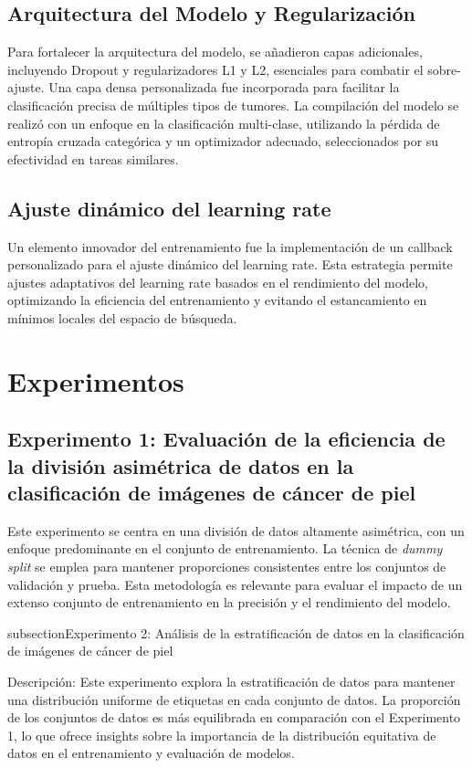 \subsection{Arquitectura del Modelo y Regularización}

Para fortalecer la arquitectura del modelo, se añadieron capas adicionales, incluyendo Dropout y regularizadores L1 y L2, esenciales para combatir el sobre-ajuste. Una capa densa personalizada fue incorporada para facilitar la clasificación precisa de múltiples tipos de tumores. La compilación del modelo se realizó con un enfoque en la clasificación multi-clase, utilizando la pérdida de entropía cruzada categórica y un optimizador adecuado, seleccionados por su efectividad en tareas similares.

\subsection{Ajuste dinámico del learning rate}

Un elemento innovador del entrenamiento fue la implementación de un callback personalizado para el ajuste dinámico del learning rate. Esta estrategia permite ajustes adaptativos del learning rate basados en el rendimiento del modelo, optimizando la eficiencia del entrenamiento y evitando el estancamiento en mínimos locales del espacio de búsqueda.


\section{Experimentos}

\subsection{Experimento 1: Evaluación de la eficiencia de la división asimétrica de datos en la clasificación de imágenes de cáncer de piel}

Este experimento se centra en una división de datos altamente asimétrica, con un enfoque predominante en el conjunto de entrenamiento. La técnica de \textit{dummy split} se emplea para mantener proporciones consistentes entre los conjuntos de validación y prueba. Esta metodología es relevante para evaluar el impacto de un extenso conjunto de entrenamiento en la precisión y el rendimiento del modelo.

subsection{Experimento 2: Análisis de la estratificación de datos en la clasificación de imágenes de cáncer de piel}

Descripción: Este experimento explora la estratificación de datos para mantener una distribución uniforme de etiquetas en cada conjunto de datos. La proporción de los conjuntos de datos es más equilibrada en comparación con el Experimento 1, lo que ofrece insights sobre la importancia de la distribución equitativa de datos en el entrenamiento y evaluación de modelos.